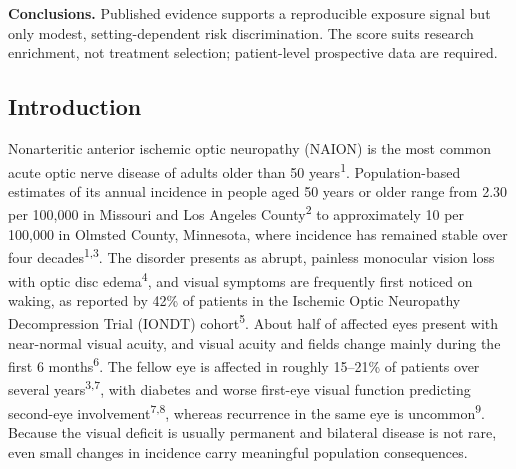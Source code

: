 \documentclass[
  11pt,
]{article}
\begin{document}
\textbf{Conclusions.} Published evidence supports a reproducible
exposure signal but only modest, setting-dependent risk discrimination.
The score suits research enrichment, not treatment selection;
patient-level prospective data are required.

\subsection{Introduction}\label{introduction}

Nonarteritic anterior ischemic optic neuropathy (NAION) is the most
common acute optic nerve disease of adults older than 50
years\textsuperscript{1}. Population-based estimates of its annual
incidence in people aged 50 years or older range from 2.30 per 100,000
in Missouri and Los Angeles County\textsuperscript{2} to approximately
10 per 100,000 in Olmsted County, Minnesota, where incidence has
remained stable over four decades\textsuperscript{1,3}. The disorder
presents as abrupt, painless monocular vision loss with optic disc
edema\textsuperscript{4}, and visual symptoms are frequently first
noticed on waking, as reported by 42\% of patients in the Ischemic Optic
Neuropathy Decompression Trial (IONDT) cohort\textsuperscript{5}. About
half of affected eyes present with near-normal visual acuity, and visual
acuity and fields change mainly during the first 6
months\textsuperscript{6}. The fellow eye is affected in roughly
15--21\% of patients over several years\textsuperscript{3,7}, with
diabetes and worse first-eye visual function predicting second-eye
involvement\textsuperscript{7,8}, whereas recurrence in the same eye is
uncommon\textsuperscript{9}. Because the visual deficit is usually
permanent and bilateral disease is not rare, even small changes in
incidence carry meaningful population consequences.
\end{document}

